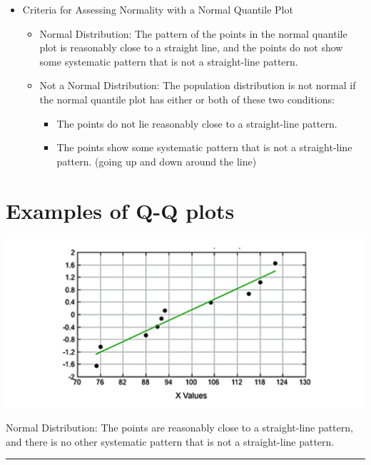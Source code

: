 \documentclass[]{book}
\providecommand{\tightlist}{%
  \setlength{\itemsep}{0pt}\setlength{\parskip}{0pt}}
\begin{document}
\begin{itemize}
\tightlist
\item
  Criteria for Assessing Normality with a Normal Quantile Plot

  \begin{itemize}
  \tightlist
  \item
    Normal Distribution: The pattern of the points in the normal quantile plot is reasonably close to a straight line, and the points do not show some systematic pattern that is not a straight-line pattern.
  \item
    Not a Normal Distribution: The population distribution is not normal if the normal quantile plot has either or both of these two conditions:

    \begin{itemize}
    \tightlist
    \item
      The points do not lie reasonably close to a straight-line pattern.
    \item
      The points show some systematic pattern that is not a straight-line pattern. (going up and down around the line)
    \end{itemize}
  \end{itemize}
\end{itemize}

\hypertarget{examples-of-q-q-plots}{%
\section{Examples of Q-Q plots}\label{examples-of-q-q-plots}}

\includegraphics{normal_QQ.png}

Normal Distribution: The points are reasonably close to a straight-line pattern, and there is no other systematic pattern that is not a straight-line pattern.

\begin{center}\rule{0.5\linewidth}{\linethickness}\end{center}
\end{document}
